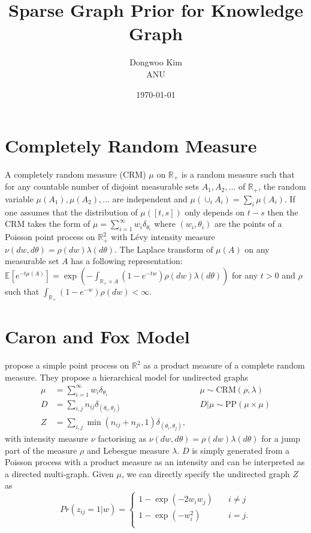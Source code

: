 \documentclass{article}
\title{Sparse Graph Prior for Knowledge Graph}
\date{\today}
\author{Dongwoo Kim\\ANU}
\begin{document}
\maketitle

\section{Completely Random Measure}
A completely random measure (CRM) $\mu$ on $\mathbb{R}_+$ is a random measure such that for any countable number of disjoint measurable sets $A_1, A_2, ...$ of $\mathbb{R}_+$, the random variable $\mu(A_1), \mu(A_2), ...$ are independent and $\mu(\cup_i A_i) = \sum_i \mu(A_i)$. If one assumes that the distribution of $\mu([t,s])$ only depends on $t-s$ then the CRM takes the form of $\mu = \sum_{i=1}^{\infty}w_i\delta_{\theta_i}$ where $(w_i, \theta_i)$ are the points of a Poisson point process on $\mathbb{R}_+^2$ with L\'{e}vy intensity measure $\nu(dw, d\theta) = \rho(dw)\lambda(d\theta)$. The Laplace transform of $\mu(A)$ on any measurable set $A$ has a following representation: $\mathbb{E}[e^{-t\mu(A)}] = \exp(-\int_{\mathbb{R}_+ \times A}(1-e^{-tw})\rho(dw)\lambda(d\theta))$ for any $t>0$ and $\rho$ such that $\int_{\mathbb{R}_+}(1-e^{-w})\rho(dw) < \infty$.

\section{Caron and Fox Model}

\cite{Caron2015} propose a simple point process on $\mathbb{R}^2$ as a product measure of a complete random measure. They propose a hierarchical model for undirected graphs
\begin{align}
\mu &= \sum_{i=1}^{\infty} w_i \delta_{\theta_i} & &\mu \sim \text{CRM}(\rho, \lambda)\\
D &= \sum_{i,j} n_{ij} \delta_{(\theta_i, \theta_j)} & &D|\mu \sim \text{PP}(\mu \times \mu)\\
Z &=\sum_{i,j} \min(n_{ij} + n_{ji}, 1)\delta_{(\theta_i, \theta_j)}, \label{eqn:cnf}&&
\end{align}
with intensity measure $\nu$ factorising as $\nu(dw, d\theta) = \rho(dw) \lambda(d\theta)$ for a jump part of the measure $\rho$ and Lebesgue measure $\lambda$. $D$ is simply generated from a Poisson process with a product measure as an intensity and can be interpreted as a directed multi-graph.
Given $\mu$, we can directly specify the undirected graph $Z$ as
\[ Pr(z_{ij}=1|w) = 
  \begin{cases}
    1 - \exp(-2w_iw_j)       & \quad i \neq j\\
    1 - \exp(-w_i^2) & \quad i = j.\\
  \end{cases}
\]
\end{document}

